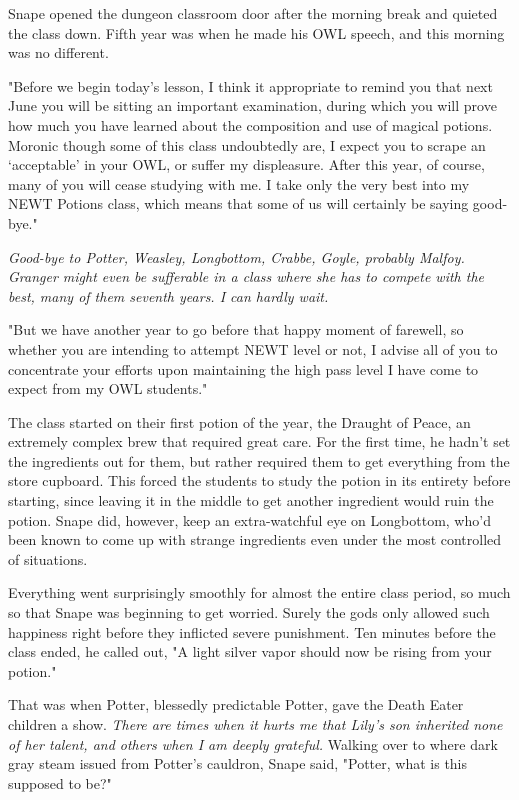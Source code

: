 \documentclass[a4paper,11pt]{article}
\begin{document}
Snape opened the dungeon classroom door after the morning break and quieted the class down. Fifth year was when he made his OWL speech, and this morning was no different.

"Before we begin today's lesson, I think it appropriate to remind you that next June you will be sitting an important examination, during which you will prove how much you have learned about the composition and use of magical potions. Moronic though some of this class undoubtedly are, I expect you to scrape an `acceptable' in your OWL, or suffer my displeasure. After this year, of course, many of you will cease studying with me. I take only the very best into my NEWT Potions class, which means that some of us will certainly be saying good-bye."

\emph{Good-bye to Potter, Weasley, Longbottom, Crabbe, Goyle, probably Malfoy. Granger might even be sufferable in a class where she has to compete with the best, many of them seventh years. I can hardly wait.}

"But we have another year to go before that happy moment of farewell, so whether you are intending to attempt NEWT level or not, I advise all of you to concentrate your efforts upon maintaining the high pass level I have come to expect from my OWL students."

The class started on their first potion of the year, the Draught of Peace, an extremely complex brew that required great care. For the first time, he hadn't set the ingredients out for them, but rather required them to get everything from the store cupboard. This forced the students to study the potion in its entirety before starting, since leaving it in the middle to get another ingredient would ruin the potion. Snape did, however, keep an extra-watchful eye on Longbottom, who'd been known to come up with strange ingredients even under the most controlled of situations.

Everything went surprisingly smoothly for almost the entire class period, so much so that Snape was beginning to get worried. Surely the gods only allowed such happiness right before they inflicted severe punishment. Ten minutes before the class ended, he called out, "A light silver vapor should now be rising from your potion."

That was when Potter, blessedly predictable Potter, gave the Death Eater children a show. \emph{There are times when it hurts me that Lily's son inherited none of her talent, and others when I am deeply grateful.} Walking over to where dark gray steam issued from Potter's cauldron, Snape said, "Potter, what is this supposed to be?"
\end{document}
